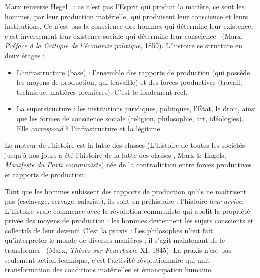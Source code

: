 \documentclass[11pt]{article}
\newcommand{\cle}[1]{{\popxbold\color{popdark}#1}}
\begin{document}
\begin{definition}
Marx \guillemotleft renverse Hegel \guillemotright\ : ce n'est pas l'Esprit qui produit la matière, ce sont les hommes, par leur \cle{production matérielle}, qui produisent leur conscience et leurs institutions. \guillemotleft Ce n'est pas la conscience des hommes qui détermine leur existence, c'est inversement leur existence sociale qui détermine leur conscience \guillemotright\ (Marx, \emph{Préface à la Critique de l'économie politique}, 1859). L'histoire se structure en deux étages :
\begin{itemize}
\item L'\cle{infrastructure} (base) : l'ensemble des \cle{rapports de production} (qui possède les moyens de production, qui travaille) et des \cle{forces productives} (travail, technique, matières premières). C'est le fondement réel.
\item La \cle{superstructure} : les institutions juridiques, politiques, l'État, le droit, ainsi que les formes de conscience sociale (religion, philosophie, art, idéologies). Elle \emph{correspond} à l'infrastructure et la légitime.
\end{itemize}
Le moteur de l'histoire est la \cle{lutte des classes} (\guillemotleft L'histoire de toutes les sociétés jusqu'à nos jours a été l'histoire de la lutte des classes \guillemotright, Marx \& Engels, \emph{Manifeste du Parti communiste}) née de la contradiction entre forces productives et rapports de production.
\end{definition}

\begin{propriete}
Tant que les hommes subissent des rapports de production qu'ils ne maîtrisent pas (esclavage, servage, salariat), ils sont en \cle{préhistoire} : l'histoire \emph{leur arrive}. L'\cle{histoire vraie} commence avec la révolution communiste qui abolit la propriété privée des moyens de production : les hommes deviennent les \cle{sujets} conscients et collectifs de leur devenir. C'est la \cle{praxis} : \guillemotleft Les philosophes n'ont fait qu'interpréter le monde de diverses manières ; il s'agit maintenant de le transformer \guillemotright\ (Marx, \emph{Thèses sur Feuerbach}, XI, 1845). La praxis n'est pas seulement action technique, c'est l'activité révolutionnaire qui unit transformation des conditions matérielles et émancipation humaine.
\end{propriete}
\end{document}
